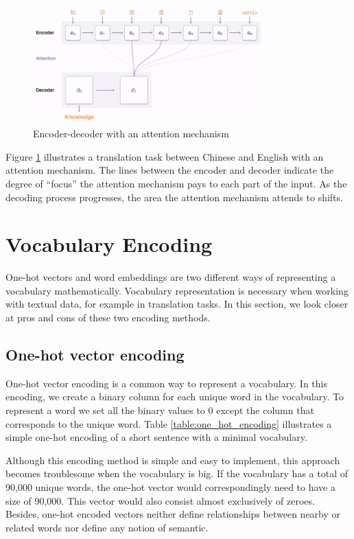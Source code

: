 \begin{figure}[ht]
    \centering
    \includegraphics[width=0.8\textwidth]{fig/background_theory/attention_chinese.png}
    \caption{Encoder-decoder with an attention mechanism}
    \label{fig:encoder-decoder-attention-google}
\end{figure}

Figure \ref{fig:encoder-decoder-attention-google} illustrates a translation task between Chinese and English with an attention mechanism. The lines between the encoder and decoder indicate the degree of ``focus'' the attention mechanism pays to each part of the input. As the decoding process progresses, the area the attention mechanism attends to shifts.


\section{Vocabulary Encoding}
\label{sec:vocabulary_encoding}
One-hot vectors and word embeddings are two different ways of representing a vocabulary mathematically. Vocabulary representation is necessary when working with textual data, for example in translation tasks. In this section, we look closer at pros and cons of these two encoding methods.

\subsection{One-hot vector encoding}
One-hot vector encoding is a common way to represent a vocabulary. In this encoding, we create a binary column for each unique word in the vocabulary. To represent a word we set all the binary values to \(0\) except the column that corresponds to the unique word. Table  \ref{table:one_hot_encoding} illustrates a simple one-hot encoding of a short sentence with a minimal vocabulary. 

Although this encoding method is simple and easy to implement, this approach becomes troublesome when the vocabulary is big. If the vocabulary has a total of 90,000 unique words, the one-hot vector would correspondingly need to have a size of 90,000. This vector would also consist almost exclusively of zeroes. Besides, one-hot encoded vectors neither define relationships between nearby or related words nor define any notion of semantic.

